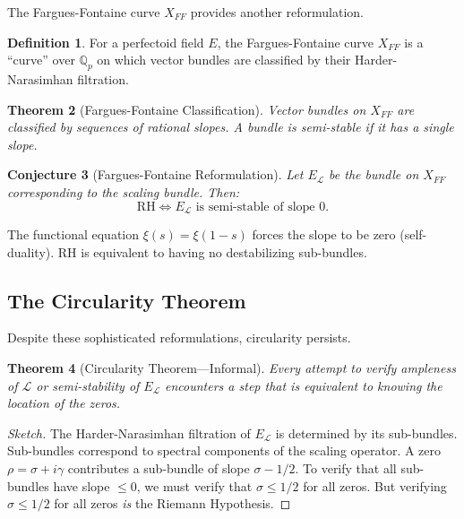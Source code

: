 \documentclass[12pt, a4paper]{article}
\newtheorem{theorem}{Theorem}[section]
\newtheorem{conjecture}[theorem]{Conjecture}
\theoremstyle{definition}
\newtheorem{definition}[theorem]{Definition}
\newcommand{\Q}{\mathbb{Q}}
\begin{document}
The Fargues-Fontaine curve $X_{FF}$ provides another reformulation.

\begin{definition}
For a perfectoid field $E$, the Fargues-Fontaine curve $X_{FF}$ is a ``curve'' over $\Q_p$ on which vector bundles are classified by their Harder-Narasimhan filtration.
\end{definition}

\begin{theorem}[Fargues-Fontaine Classification]
Vector bundles on $X_{FF}$ are classified by sequences of rational slopes. A bundle is semi-stable if it has a single slope.
\end{theorem}

\begin{conjecture}[Fargues-Fontaine Reformulation]
Let $E_\mathcal{L}$ be the bundle on $X_{FF}$ corresponding to the scaling bundle. Then:
\begin{equation}
\text{RH} \iff E_\mathcal{L} \text{ is semi-stable of slope } 0.
\end{equation}
\end{conjecture}

The functional equation $\xi(s) = \xi(1-s)$ forces the slope to be zero (self-duality). RH is equivalent to having no destabilizing sub-bundles.

\subsection{The Circularity Theorem}

Despite these sophisticated reformulations, circularity persists.

\begin{theorem}[Circularity Theorem---Informal]
Every attempt to verify ampleness of $\mathcal{L}$ or semi-stability of $E_\mathcal{L}$ encounters a step that is equivalent to knowing the location of the zeros.
\end{theorem}

\begin{proof}[Sketch]
The Harder-Narasimhan filtration of $E_\mathcal{L}$ is determined by its sub-bundles. Sub-bundles correspond to spectral components of the scaling operator. A zero $\rho = \sigma + i\gamma$ contributes a sub-bundle of slope $\sigma - 1/2$. To verify that all sub-bundles have slope $\leq 0$, we must verify that $\sigma \leq 1/2$ for all zeros. But verifying $\sigma \leq 1/2$ for all zeros \textit{is} the Riemann Hypothesis.
\end{proof}
\end{document}
